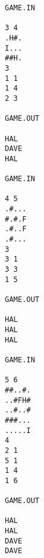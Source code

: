 \begin{verbatim}
GAME.IN

3 4
.H#.
I...
##H.
3
1 1
1 4
2 3

GAME.OUT

HAL
DAVE
HAL

GAME.IN

4 5
.#...
#.#.F
.#..F
.#...
3
3 1
3 3
1 5

GAME.OUT

HAL
HAL
HAL

GAME.IN

5 6
##..#.
..#FH#
..#..#
###...
.....I
4
2 1
5 1
1 4
1 6

GAME.OUT

HAL
HAL
DAVE
DAVE

\end{verbatim}